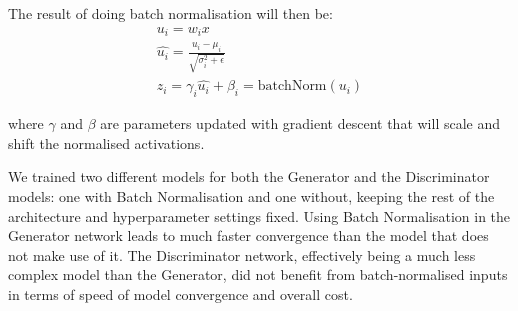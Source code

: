 The result of doing batch normalisation will then be:
\begin{gather*}
u_i = w_ix \\
\hat{u_i} = \frac{u_i-\mu_i}{\sqrt{\sigma_i^2 + \epsilon}} \\
z_i = \gamma_i\hat{u_i}+\beta_i = \text{batchNorm}({u_i})
\end{gather*}

where $\gamma$ and $\beta$ are parameters updated with gradient descent that will scale and shift the normalised activations.

We trained two different models for both the Generator and the Discriminator models: one with Batch Normalisation and one without, keeping the rest of the architecture and hyperparameter settings fixed.
Using Batch Normalisation in the Generator network leads to much faster convergence than the model that does not make use of it.
The Discriminator network, effectively being a much less complex model than the Generator, did not benefit from batch-normalised inputs in terms of speed of model convergence and overall cost.

